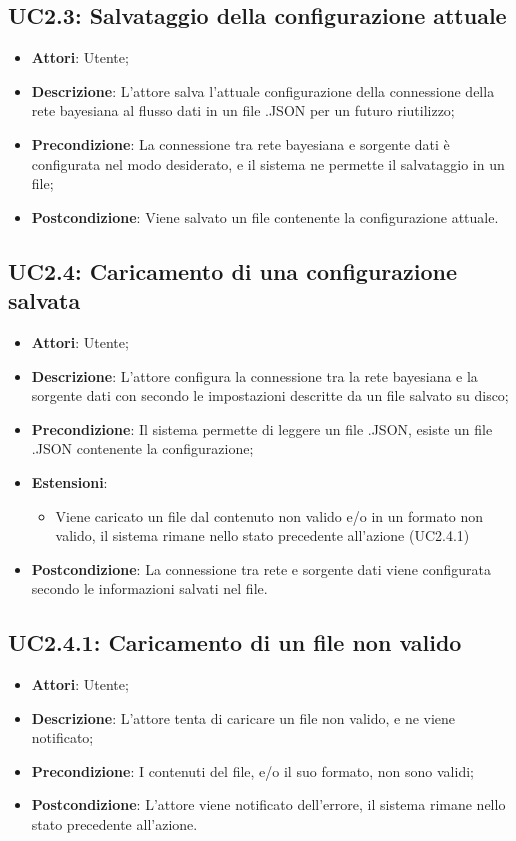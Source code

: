 \subsection{UC2.3: Salvataggio della configurazione attuale}

\hypertarget{UC2.3}{}
\begin{itemize}
	\item \textbf{Attori}: Utente;
	\item \textbf{Descrizione}: L'attore salva l'attuale configurazione della connessione della rete bayesiana al flusso dati in un file .JSON per un futuro riutilizzo;
	\item \textbf{Precondizione}: La connessione tra rete bayesiana e sorgente dati è configurata nel modo desiderato, e il sistema ne permette il salvataggio in un file;
	\item \textbf{Postcondizione}: Viene salvato un file contenente la configurazione attuale.
\end{itemize}

\subsection{UC2.4: Caricamento di una configurazione salvata}
\hypertarget{UC2.4}{}
\begin{itemize}
	\item \textbf{Attori}: Utente;
	\item \textbf{Descrizione}: L'attore configura la connessione tra la rete bayesiana e la sorgente dati con secondo le impostazioni descritte da un file salvato su disco;
	\item \textbf{Precondizione}: Il sistema permette di leggere un file .JSON, esiste un file .JSON contenente la configurazione;
	\item \textbf{Estensioni}: 
	\begin{itemize}
		\item  Viene caricato un file dal contenuto non valido e/o in un formato non valido, il sistema rimane nello stato precedente all'azione (UC2.4.1)
	\end{itemize}
	\item \textbf{Postcondizione}: La connessione tra rete e sorgente dati viene configurata secondo le informazioni salvati nel file.
\end{itemize}

\subsection{UC2.4.1: Caricamento di un file non valido}
\hypertarget{UC2.4.1}{}
\begin{itemize}
	\item \textbf{Attori}: Utente;
	\item \textbf{Descrizione}: L'attore tenta di caricare un file non valido, e ne viene notificato;
	\item \textbf{Precondizione}: I contenuti del file, e/o il suo formato, non sono validi;
	\item \textbf{Postcondizione}: L'attore viene notificato dell'errore, il sistema rimane nello stato precedente all'azione.
\end{itemize}

